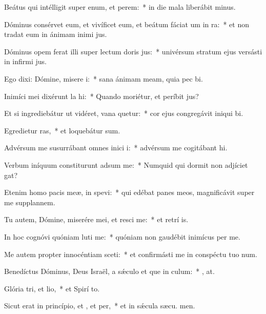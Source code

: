 \item Beátus qui intélligit super enum, et perem:~* in die mala liberábit  minus.
\item Dóminus consérvet eum, et vivíficet eum, et beátum fáciat um in ra:~* et non tradat eum in ánimam inimi jus.
\item Dóminus opem ferat illi super lectum doris jus:~* univérsum stratum ejus versásti in infirmi jus.
\item Ego dixi: Dómine, misere i:~* sana ánimam meam, quia pec bi.
\item Inimíci mei dixérunt la hi:~* Quando moriétur, et períbit  jus?
\item Et si ingrediebátur ut vidéret, vana quetur:~* cor ejus congregávit iniqui bi.
\item Egredietur ras,~* et loquebátur  sum.
\item Advérsum me susurrábant omnes inici i:~* advérsum me cogitábant  hi.
\item Verbum iníquum constiturunt adsum me:~* Numquid qui dormit non adjíciet  gat?
\item Etenim homo pacis meæ, in  spevi:~* qui edébat panes meos, magnificávit super me supplannem.
\item Tu autem, Dómine, miserére mei, et resci me:~* et retrí is.
\item In hoc cognóvi quóniam luti me:~* quóniam non gaudébit inimícus  per me.
\item Me autem propter innocéntiam sceti:~* et confirmásti me in conspéctu tuo  num.
\item Benedíctus Dóminus, Deus Israël, a sǽculo et que in culum:~* , at.
\item Glória tri, et lio,~* et Spirí to.
\item Sicut erat in princípio, et , et per,~* et in sǽcula sæcu. men.
